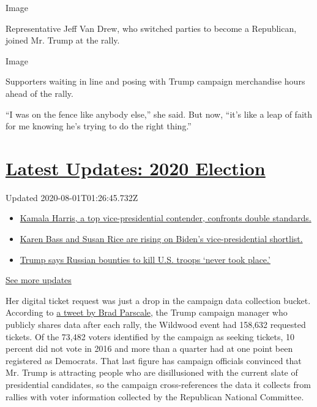 Image

Representative Jeff Van Drew, who switched parties to become a
Republican, joined Mr. Trump at the rally.

Image

Supporters waiting in line and posing with Trump campaign merchandise
hours ahead of the rally.

``I was on the fence like anybody else,'' she said. But now, ``it's like
a leap of faith for me knowing he's trying to do the right thing.''

\hypertarget{latest-updates-2020-election}{%
\section{\texorpdfstring{\href{https://www.nytimes.com/2020/07/31/us/elections/biden-vs-trump.html?action=click\&pgtype=Article\&state=default\&region=MAIN_CONTENT_1\&context=storylines_live_updates}{Latest
Updates: 2020
Election}}{Latest Updates: 2020 Election}}\label{latest-updates-2020-election}}

Updated 2020-08-01T01:26:45.732Z

\begin{itemize}
\tightlist
\item
  \href{https://www.nytimes.com/2020/07/31/us/elections/biden-vs-trump.html?action=click\&pgtype=Article\&state=default\&region=MAIN_CONTENT_1\&context=storylines_live_updates\#link-29fdff45}{Kamala
  Harris, a top vice-presidential contender, confronts double
  standards.}
\item
  \href{https://www.nytimes.com/2020/07/31/us/elections/biden-vs-trump.html?action=click\&pgtype=Article\&state=default\&region=MAIN_CONTENT_1\&context=storylines_live_updates\#link-13ec3d9c}{Karen
  Bass and Susan Rice are rising on Biden's vice-presidential
  shortlist.}
\item
  \href{https://www.nytimes.com/2020/07/31/us/elections/biden-vs-trump.html?action=click\&pgtype=Article\&state=default\&region=MAIN_CONTENT_1\&context=storylines_live_updates\#link-49e9a016}{Trump
  says Russian bounties to kill U.S. troops `never took place.'}
\end{itemize}

\href{https://www.nytimes.com/2020/07/31/us/elections/biden-vs-trump.html?action=click\&pgtype=Article\&state=default\&region=MAIN_CONTENT_1\&context=storylines_live_updates}{See
more updates}

Her digital ticket request was just a drop in the campaign data
collection bucket. According to
\href{https://twitter.com/parscale/status/1222317267716837386?lang=en}{a
tweet by Brad Parscale}, the Trump campaign manager who publicly shares
data after each rally, the Wildwood event had 158,632 requested tickets.
Of the 73,482 voters identified by the campaign as seeking tickets, 10
percent did not vote in 2016 and more than a quarter had at one point
been registered as Democrats. That last figure has campaign officials
convinced that Mr. Trump is attracting people who are disillusioned with
the current slate of presidential candidates, so the campaign
cross-references the data it collects from rallies with voter
information collected by the Republican National Committee.

